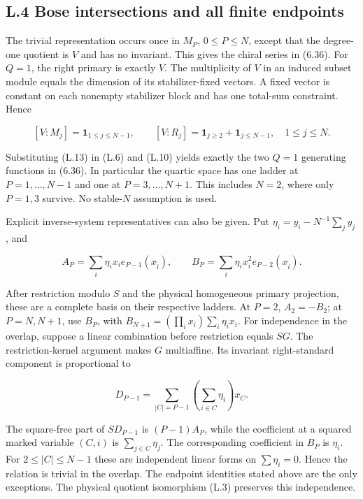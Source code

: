 \documentclass[a4paper,11pt]{article}
\numberwithin{equation}{section}
\begin{document}
\hypertarget{l.4-bose-intersections-and-all-finite-endpoints}{%
\subsection{L.4 Bose intersections and all finite endpoints}\label{l.4-bose-intersections-and-all-finite-endpoints}}

The trivial representation occurs once in \(M_P\), \(0\le P\le N\), except that the degree-one quotient is \(V\) and has no invariant. This gives the chiral series in (6.36). For \(Q=1\), the right primary is exactly \(V\). The multiplicity of \(V\) in an induced subset module equals the dimension of its stabilizer-fixed vectors. A fixed vector is constant on each nonempty stabilizer block and has one total-sum constraint. Hence

\[
[V:M_j]=\mathbf1_{1\le j\le N-1},\qquad
[V:R_j]=\mathbf1_{j\ge2}+\mathbf1_{j\le N-1},\quad1\le j\le N.
\tag{L.13}
\]

Substituting (L.13) in (L.6) and (L.10) yields exactly the two \(Q=1\) generating functions in (6.36). In particular the quartic space has one ladder at \(P=1,\ldots,N-1\) and one at \(P=3,\ldots,N+1\). This includes \(N=2\), where only \(P=1,3\) survive. No stable-\(N\) assumption is used.

Explicit inverse-system representatives can also be given. Put \(\eta_i=y_i-N^{-1}\sum_jy_j\), and

\[
A_P=\sum_i\eta_ix_i e_{P-1}(x_{\widehat i}),\qquad
B_P=\sum_i\eta_ix_i^2e_{P-2}(x_{\widehat i}).
\tag{L.14}
\]

After restriction modulo \(S\) and the physical homogeneous primary projection, these are a complete basis on their respective ladders. At \(P=2\), \(A_2=-B_2\); at \(P=N,N+1\), use \(B_P\), with \(B_{N+1}=(\prod_i x_i)\sum_i\eta_ix_i\). For independence in the overlap, suppose a linear combination before restriction equals \(SG\). The restriction-kernel argument makes \(G\) multiaffine. Its invariant right-standard component is proportional to

\[
D_{P-1}=\sum_{|C|=P-1}\left(\sum_{i\in C}\eta_i\right)x_C.
\]

The square-free part of \(SD_{P-1}\) is \((P-1)A_P\), while the coefficient at a squared marked variable \((C,i)\) is \(\sum_{j\in C}\eta_j\). The corresponding coefficient in \(B_P\) is \(\eta_i\). For \(2\le|C|\le N-1\) these are independent linear forms on \(\sum\eta_i=0\). Hence the relation is trivial in the overlap. The endpoint identities stated above are the only exceptions. The physical quotient isomorphism (L.3) preserves this independence.
\end{document}
